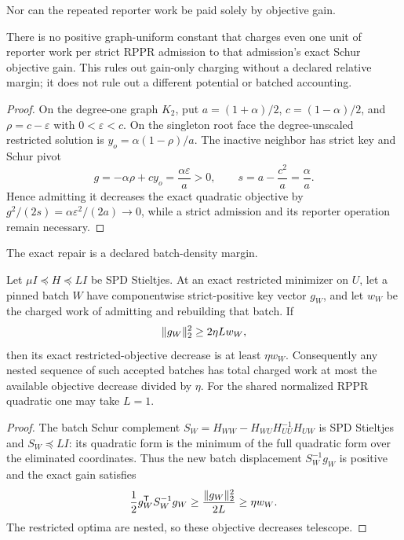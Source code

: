 Nor can the repeated reporter work be paid solely by objective gain.

\begin{proposition}
\label{prop:aesp-cd-objective-gain-charge-stop}
There is no positive graph-uniform constant that charges even one unit of
reporter work per strict RPPR admission to that admission's exact Schur
objective gain.  This rules out gain-only charging without a declared relative
margin; it does not rule out a different potential or batched accounting.
\end{proposition}

\begin{proof}
On the degree-one graph $K_2$, put
$a=(1+\alpha)/2$, $c=(1-\alpha)/2$, and
$\rho=c-\varepsilon$ with $0<\varepsilon<c$.  On the singleton root face the
degree-unscaled restricted solution is
$y_o=\alpha(1-\rho)/a$.  The inactive neighbor has strict key and Schur pivot
\begin{equation*}
 g=-\alpha\rho+cy_o=\frac{\alpha\varepsilon}{a}>0,
 \qquad
 s=a-\frac{c^2}{a}=\frac{\alpha}{a}.
\end{equation*}
Hence admitting it decreases the exact quadratic objective by
$g^2/(2s)=\alpha\varepsilon^2/(2a)\to0$, while a strict admission and its
reporter operation remain necessary.
\end{proof}

The exact repair is a declared batch-density margin.

\begin{corollary}
\label{cor:aesp-cd-schur-gain-batch-payment}
Let $\mu I\preceq H\preceq LI$ be SPD Stieltjes.  At an exact restricted
minimizer on $U$, let a pinned batch $W$ have componentwise strict-positive
key vector $g_W$, and let $w_W$ be the charged work of admitting and rebuilding
that batch.  If
\begin{equation*}
 \lVert g_W\rVert_2^2\geq2\eta Lw_W,
\end{equation*}
then its exact restricted-objective decrease is at least $\eta w_W$.
Consequently any nested sequence of such accepted batches has total charged
work at most the available objective decrease divided by $\eta$.
For the shared normalized RPPR quadratic one may take $L=1$.
\end{corollary}

\begin{proof}
The batch Schur complement
$S_W=H_{WW}-H_{WU}H_{UU}^{-1}H_{UW}$ is SPD Stieltjes and
$S_W\preceq LI$: its quadratic form is the minimum of the full quadratic form
over the eliminated coordinates.  Thus the new batch displacement
$S_W^{-1}g_W$ is positive and the exact gain satisfies
\begin{equation*}
 \frac12 g_W^{\mathsf T}S_W^{-1}g_W
 \geq \frac{\lVert g_W\rVert_2^2}{2L}
 \geq \eta w_W.
\end{equation*}
The restricted optima are nested, so these objective decreases telescope.
\end{proof}


